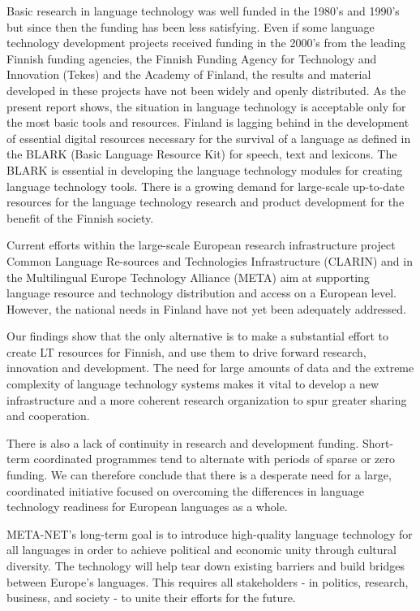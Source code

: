 \documentclass[]{../../metanetpaper}
\begin{document}
\begin{multicols}{2}
Basic research in language technology was well funded in the 1980's
and 1990's but since then the funding has been less satisfying. Even
if some language technology development projects received funding in
the 2000's from the leading Finnish funding agencies, the Finnish
Funding Agency for Technology and Innovation (Tekes) and the Academy
of Finland, the results and material developed in these projects have
not been widely and openly distributed. As the present report shows,
the situation in language technology is acceptable only for the most
basic tools and resources. Finland is lagging behind in the
development of essential digital resources necessary for the survival
of a language as defined in the BLARK (Basic Language Resource Kit)
for speech, text and lexicons. The BLARK is essential in developing
the language technology modules for creating language technology
tools. There is a growing demand for large-scale up-to-date resources
for the language technology research and product development for the
benefit of the Finnish society.

Current efforts within the large-scale European research
infrastructure project Common Language Re-sources and Technologies
Infrastructure (CLARIN) and in the Multilingual Europe Technology
Alliance (META) aim at supporting language resource and technology
distribution and access on a European level. However, the national
needs in Finland have not yet been adequately addressed.

Our findings show that the only alternative is to make a substantial
effort to create LT resources for Finnish, and use them to drive
forward research, innovation and development. The need for large
amounts of data and the extreme complexity of language technology
systems makes it vital to develop a new infrastructure and a more
coherent research organization to spur greater sharing and
cooperation.

There is also a lack of continuity in research and development
funding.  Short-term coordinated programmes tend to alternate with
periods of sparse or zero funding. We can therefore conclude that
there is a desperate need for a large, coordinated initiative focused
on overcoming the differences in language technology readiness for
European languages as a whole.

META-NET’s long-term goal is to introduce high-quality language
technology for all languages in order to achieve political and
economic unity through cultural diversity. The technology will help
tear down existing barriers and build bridges between Europe’s
languages. This requires all stakeholders - in politics, research,
business, and society - to unite their efforts for the future.

\end{multicols}
\end{document}

